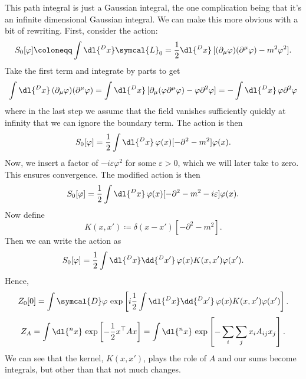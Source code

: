 \documentclass[fleqn]{NotesClass}
\newcommand{\dalembertian}{\partial^2}
\newcommand{\lagrangianDensity}{\symcal{L}}
\newcommand{\trans}{{\top}}
\newcommand{\DL}[1]{\symcal{D}#1}
\begin{document}
    This path integral is just a Gaussian integral, the one complication being that it's an infinite dimensional Gaussian integral.
    We can make this more obvious with a bit of rewriting.
    First, consider the action:
    \begin{align}
        S_0[\varphi] \coloneqq \int \dl{^Dx} \lagrangianDensity_0 = \frac{1}{2} \dl{^Dx} \, [(\partial_\mu\varphi)(\partial^\mu\varphi) - m^2\varphi^2].
    \end{align}
    Take the first term and integrate by parts to get
    \begin{equation}
        \int \dl{^Dx} \, (\partial_\mu \varphi)(\partial^\mu \varphi) = \int \dl{^Dx} \, [ \partial_\mu(\varphi\partial^\mu \varphi) - \varphi\dalembertian\varphi] = -\int \dl{^Dx} \, \varphi\dalembertian\varphi
    \end{equation}
    where in the last step we assume that the field vanishes sufficiently quickly at infinity that we can ignore the boundary term.
    The action is then
    \begin{equation}
        S_0[\varphi] = \frac{1}{2} \int \dl{^Dx} \, \varphi(x) [-\dalembertian - m^2] \varphi(x).
    \end{equation}
    Now, we insert a factor of \(-i\varepsilon \varphi^2\) for some \(\varepsilon > 0\), which we will later take to zero.
    This ensures convergence.
    The modified action is then
    \begin{equation}
        S_0[\varphi] = \frac{1}{2} \int \dl{^Dx} \, \varphi(x) [-\dalembertian - m^2 - i\varepsilon] \varphi(x).
    \end{equation}
    Now define
    \begin{equation}
        K(x, x') \coloneqq \delta(x - x')[-\dalembertian - m^2].
    \end{equation}
    Then we can write the action as
    \begin{equation}
        S_0[\varphi] = \frac{1}{2} \int \dl{^Dx} \dd{^Dx'} \, \varphi(x) K(x, x') \varphi(x').
    \end{equation}
    Hence,
    \begin{equation}
        Z_0[0] = \int \DL{\varphi} \, \exp\left[ i\frac{1}{2} \int \dl{^Dx} \dd{^Dx'} \, \varphi(x) K(x, x') \varphi(x') \right].
    \end{equation}
    \begin{equation}
        Z_A = \int \dl{^nx} \, \exp\left[ -\frac{1}{2}x^\trans A x \right] = \int \dl{^nx} \, \exp\left[ -\sum_{i}\sum_{j} x_iA_{ij}x_j \right].
    \end{equation}
    We can see that the kernel, \(K(x, x')\), plays the role of \(A\) and our sums become integrals, but other than that not much changes.
    
\end{document}
